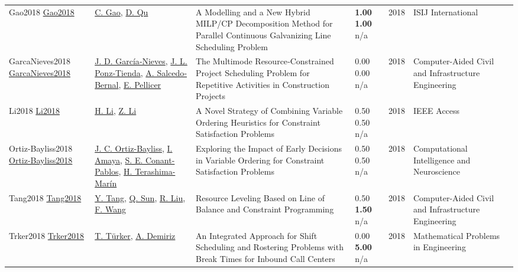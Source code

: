 {\begin{longtable}{p{3cm}p{5cm}p{10cm}p{1cm}rp{2.5cm}l}
Gao2018 \href{http://dx.doi.org/10.2355/isijinternational.isijint-2018-305}{Gao2018} & \hyperref[auth:a1712]{C. Gao}, \hyperref[auth:a1713]{D. Qu} & \cellcolor{gold!20}A Modelling and a New Hybrid MILP/CP Decomposition Method for Parallel Continuous Galvanizing Line Scheduling Problem & \noindent{}\textbf{1.00} \textbf{1.00} n/a & 2018 & ISIJ International & \cite{Gao2018}\\
GarcaNieves2018 \href{http://dx.doi.org/10.1111/mice.12356}{GarcaNieves2018} & \hyperref[auth:a1724]{J. D. García‐Nieves}, \hyperref[auth:a1725]{J. L. Ponz‐Tienda}, \hyperref[auth:a1726]{A. Salcedo‐Bernal}, \hyperref[auth:a1727]{E. Pellicer} & \cellcolor{green!10}The Multimode Resource‐Constrained Project Scheduling Problem for Repetitive Activities in Construction Projects & \noindent{}\textcolor{black!50}{0.00} \textcolor{black!50}{0.00} n/a & 2018 & Computer-Aided Civil and Infrastructure Engineering & \cite{GarcaNieves2018}\\
Li2018 \href{http://dx.doi.org/10.1109/access.2018.2859618}{Li2018} & \hyperref[auth:a1796]{H. Li}, \hyperref[auth:a1801]{Z. Li} & \cellcolor{gold!20}A Novel Strategy of Combining Variable Ordering Heuristics for Constraint Satisfaction Problems & \noindent{}0.50 0.50 n/a & 2018 & IEEE Access & \cite{Li2018}\\
Ortiz-Bayliss2018 \href{http://dx.doi.org/10.1155/2018/6103726}{Ortiz-Bayliss2018} & \hyperref[auth:a1781]{J. C. Ortiz-Bayliss}, \hyperref[auth:a1604]{I. Amaya}, \hyperref[auth:a1782]{S. E. Conant-Pablos}, \hyperref[auth:a1608]{H. Terashima-Marín} & \cellcolor{gold!20}Exploring the Impact of Early Decisions in Variable Ordering for Constraint Satisfaction Problems & \noindent{}0.50 0.50 n/a & 2018 & Computational Intelligence and Neuroscience & \cite{Ortiz-Bayliss2018}\\
Tang2018 \href{http://dx.doi.org/10.1111/mice.12383}{Tang2018} & \hyperref[auth:a555]{Y. Tang}, \hyperref[auth:a558]{Q. Sun}, \hyperref[auth:a556]{R. Liu}, \hyperref[auth:a557]{F. Wang} & Resource Leveling Based on Line of Balance and Constraint Programming & \noindent{}0.50 \textbf{1.50} n/a & 2018 & Computer-Aided Civil and Infrastructure Engineering & \cite{Tang2018}\\
Trker2018 \href{http://dx.doi.org/10.1155/2018/7870849}{Trker2018} & \hyperref[auth:a1714]{T. Türker}, \hyperref[auth:a1715]{A. Demiriz} & \cellcolor{gold!20}An Integrated Approach for Shift Scheduling and Rostering Problems with Break Times for Inbound Call Centers & \noindent{}\textcolor{black!50}{0.00} \textbf{5.00} n/a & 2018 & Mathematical Problems in Engineering & \cite{Trker2018}\\

\end{longtable}}
